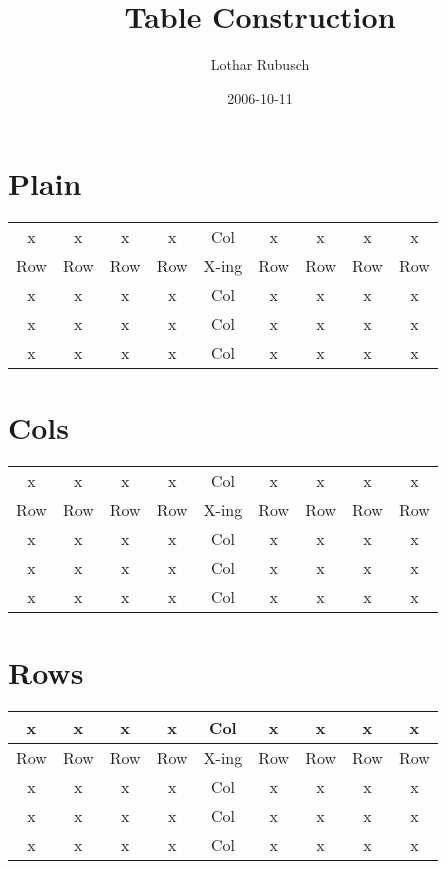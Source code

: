 \documentclass[a4paper,10pt]{scrartcl}
\title{Table Construction}
\author{Lothar Rubusch}
\date{2006-10-11}
\begin{document}
\sffamily

\maketitle

\parindent0mm

\section{Plain}
\begin{tabular}{ccccccccc}
x & x & x & x & Col & x & x & x & x \\ 
Row & Row & Row & Row & X-ing & Row & Row & Row & Row \\ 
x & x & x & x & Col & x & x & x & x \\ 
x & x & x & x & Col & x & x & x & x \\ 
x & x & x & x & Col & x & x & x & x \\ 
\end{tabular}
\newline


\section{Cols}
\begin{tabular}{|c|c|c|c|c|c|c|c|c|}
x & x & x & x & Col & x & x & x & x \\ 
Row & Row & Row & Row & X-ing & Row & Row & Row & Row \\ 
x & x & x & x & Col & x & x & x & x \\ 
x & x & x & x & Col & x & x & x & x \\ 
x & x & x & x & Col & x & x & x & x \\ 
\end{tabular}
\newline


\section{Rows}
\begin{tabular}{ccccccccc} \hline
x & x & x & x & Col & x & x & x & x \\ \hline 
Row & Row & Row & Row & X-ing & Row & Row & Row & Row \\ \hline 
x & x & x & x & Col & x & x & x & x \\ \hline
x & x & x & x & Col & x & x & x & x \\ \hline
x & x & x & x & Col & x & x & x & x \\ \hline
\end{tabular}
\newline
\end{document}
